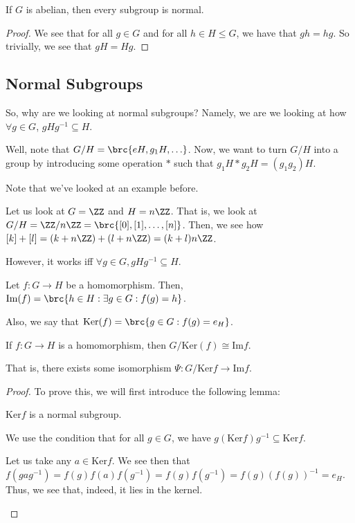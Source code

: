 \documentclass[openany]{book}
\begin{document}
\begin{prop}
	If $G$ is abelian, then every subgroup is normal.
\end{prop}
\begin{proof}
	We see that for all $g \in G$ and for all $h \in H \leq G$, we have that $gh = hg$. So trivially, we see that $gH = Hg$.
\end{proof}

\subsection{Normal Subgroups}
So, why are we looking at normal subgroups? Namely, we are we looking at how $\forall g \in G$, $gHg^{-1} \subseteq H$.

Well, note that $G / H = \brc{eH, g_1H, \ldots}$. Now, we want to turn $G/H$ into a group by introducing some operation $*$ such that $g_1 H * g_2 H = (g_1g_2)H$.

\begin{example}
	Note that we've looked at an example before.
	
	Let us look at $G = \ZZ$ and $H = n\ZZ$. That is, we look at $G/H = \ZZ/n\ZZ = \brc{[0], [1], \ldots, [n]}$. Then, we see how $[k] + [l] = (k + n\ZZ) + (l + n\ZZ) = (k+l)n\ZZ$.
\end{example}

However, it works iff $\forall g \in G, gHg^{-1} \subseteq H$.

\begin{defn}
	Let $f : G \rightarrow H$ be a homomorphism. Then, $\mathrm{Im}(f) = \brc{h \in H : \exists g \in G : f(g) = h}$.
	
	Also, we say that $\mathrm{Ker}(f) = \brc{g \in G : f(g) = e_H}$.
\end{defn}

\begin{thm}
	If $f : G \rightarrow H$ is a homomorphism, then $G / \mathrm{Ker}(f) \cong \mathrm{Im} f$.
	
	That is, there exists some isomorphism $\Psi : G / \mathrm{Ker}f \rightarrow \mathrm{Im} f$.
\end{thm}
\begin{proof}
	To prove this, we will first introduce the following lemma:
	
	\begin{lem}
		$\mathrm{Ker}f$ is a normal subgroup.
	\end{lem}
	\begin{innerproof}
		We use the condition that for all $g \in G$, we have $g ( \mathrm{Ker}f)g^{-1} \subseteq \mathrm{Ker} f$.
		
		Let us take any $a \in \mathrm{Ker}f$. We see then that $f(gag^{-1}) = f(g)f(a)f(g^{-1}) = f(g)f(g^{-1}) = f(g)(f(g))^{-1} = e_H$. Thus, we see that, indeed, it lies in the kernel.
	\end{innerproof}
\end{proof}
\end{document}
